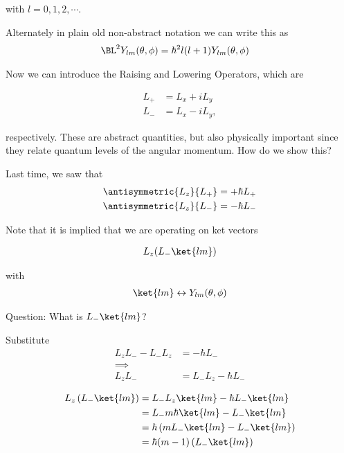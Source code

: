 with $l = 0, 1, 2, \cdots$.

Alternately in plain old non-abstract notation we can write this as
\begin{align}\label{eqn:PHY356Foct19:1009}
\BL^2 Y_{lm}(\theta, \phi) &= \hbar^2 l (l + 1) Y_{lm}(\theta, \phi)
\end{align}

Now we can introduce the Raising and Lowering Operators, which are

\begin{align}\label{eqn:PHY356Foct19:1010}
L_{+} &= L_x + i L_y \\
L_{-} &= L_x - i L_y,
\end{align}

respectively.  These are abstract quantities, but also physically important since they relate quantum levels of the angular momentum.  How do we show this?

Last time, we saw that
\begin{align}\label{eqn:PHY356Foct19:1011}
\antisymmetric{L_z}{L_{+}} &= +\hbar L_{+} \\
\antisymmetric{L_z}{L_{-}} &= -\hbar L_{-}
\end{align}

Note that it is implied that we are operating on ket vectors

\begin{align*}
L_z (L_{-} \ket{lm} )
\end{align*}

with
\begin{align}\label{eqn:PHY356Foct19:1012}
\ket{lm} \leftrightarrow Y_{lm}(\theta, \phi)
\end{align}

Question: What is $L_{-} \ket{lm}$?

Substitute
\begin{align*}
L_z L_{-} - L_{-} L_z &= - \hbar L_{-} \\
\implies \\
L_z L_{-} &= L_{-} L_z - \hbar L_{-}
\end{align*}

\begin{align*}
L_z \left( L_{-} \ket{lm} \right)
&=
L_{-} L_z \ket{lm} - \hbar L_{-} \ket{lm} \\
&=
L_{-} m \hbar \ket{lm} - L_{-} \ket{lm} \\
&=
\hbar \left( m L_{-} \ket{lm} - L_{-} \ket{lm} \right) \\
&=
\hbar (m-1) \left( L_{-} \ket{lm} \right)
\end{align*}

